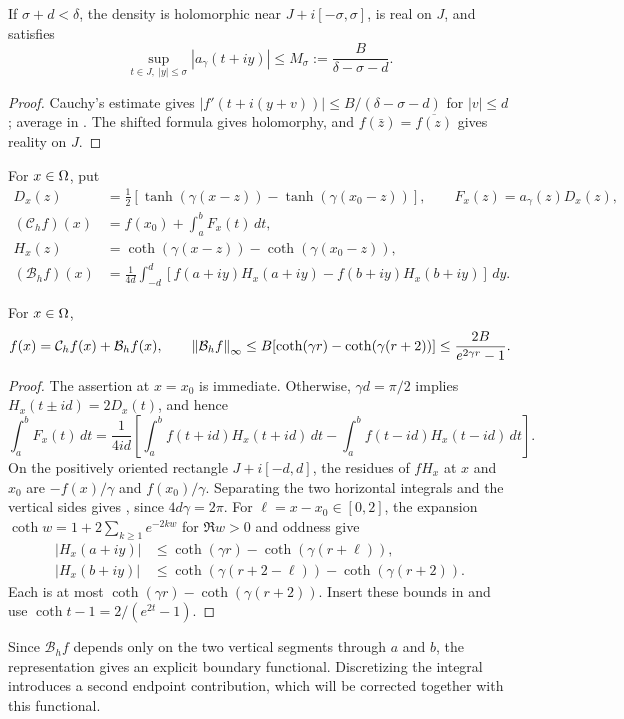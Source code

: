 \begin{lemma}
\label{lem:density}
If $\sigma+d<\delta$, the density is holomorphic near
$J+i[-\sigma,\sigma]$, is real on $J$, and satisfies
\begin{equation}
 \sup_{t\in J,\ |y|\le\sigma}|a_\gamma(t+iy)|
 \le M_\sigma:=\frac B{\delta-\sigma-d}.
 \label{eq:density-bound}
\end{equation}
\end{lemma}
\begin{proof}
Cauchy's estimate gives $|f'(t+i(y+v))|\le B/(\delta-\sigma-d)$ for
$|v|\le d$; average in . The shifted formula gives
holomorphy, and $f(\bar z)=\overline{f(z)}$ gives reality on $J$.
\end{proof}
For $x\in\Omega$, put
\begin{align}
 D_x(z)&=\tfrac12[\tanh(\gamma(x-z))-\tanh(\gamma(x_0-z))],
 \qquad F_x(z)=a_\gamma(z)D_x(z), \label{eq:D-F}\\
 (\mathcal C_h f)(x)&=f(x_0)+\int_a^bF_x(t)\,dt, \label{eq:Ch}\\
 H_x(z)&=\coth(\gamma(x-z))-\coth(\gamma(x_0-z)), \label{eq:Hx}\\
 (\mathcal B_hf)(x)&=\frac1{4d}\int_{-d}^d
 [f(a+iy)H_x(a+iy)-f(b+iy)H_x(b+iy)]\,dy. \label{eq:Bh}
\end{align}

\begin{lemma}
\label{lem:finite-rep}
For $x\in\Omega$,
\begin{equation}
 f(x)=\mathcal C_hf(x)+\mathcal B_hf(x),\qquad
 \left\lVert \mathcal B_hf\right\rVert_\infty
 \le B[\coth(\gamma r)-\coth(\gamma(r+2))]
 \le\frac{2B}{e^{2\gamma r}-1}.
 \label{eq:finite-rep}
\end{equation}
\end{lemma}
\begin{proof}
The assertion at $x=x_0$ is immediate. Otherwise, $\gamma d=\pi/2$ implies
$H_x(t\pm id)=2D_x(t)$, and hence
\[
 \int_a^bF_x(t)\,dt=\frac1{4id}\left[
 \int_a^b f(t+id)H_x(t+id)\,dt-
 \int_a^b f(t-id)H_x(t-id)\,dt\right].
\]
On the positively oriented rectangle $J+i[-d,d]$, the residues of $fH_x$
at $x$ and $x_0$ are $-f(x)/\gamma$ and $f(x_0)/\gamma$.
Separating the two horizontal integrals and the vertical sides gives
, since $4d\gamma=2\pi$.
For $\ell=x-x_0\in[0,2]$, the expansion
$\coth w=1+2\sum_{k\ge1}e^{-2kw}$ for $\Re w>0$ and oddness give
\begin{align*}
 |H_x(a+iy)|&\le\coth(\gamma r)-\coth(\gamma(r+\ell)),\\
 |H_x(b+iy)|&\le\coth(\gamma(r+2-\ell))-\coth(\gamma(r+2)).
\end{align*}
Each is at most $\coth(\gamma r)-\coth(\gamma(r+2))$.
Insert these bounds in  and use
$\coth t-1=2/(e^{2t}-1)$.
\end{proof}
Since $\mathcal B_h f$ depends only on the two vertical segments through
$a$ and $b$, the representation gives an explicit boundary functional.
Discretizing the integral introduces a second endpoint contribution, which
will be corrected together with this functional.

